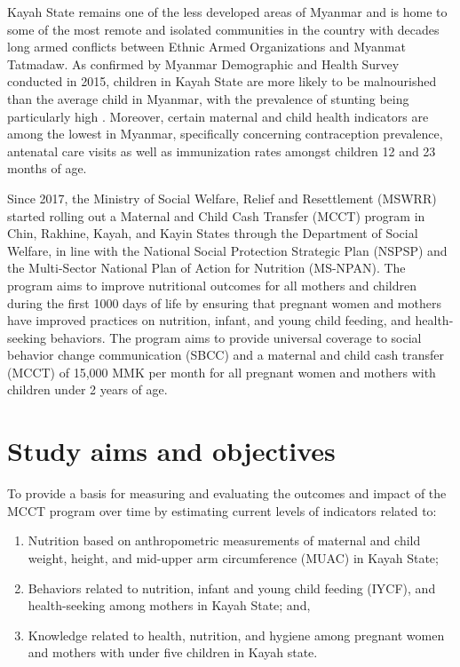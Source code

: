 \documentclass[12pt,a4paper]{article}
\begin{document}
Kayah State remains one of the less developed areas of Myanmar and is home to some of the most remote and isolated communities in the country with decades long armed conflicts between Ethnic Armed Organizations and Myanmat Tatmadaw. As confirmed by Myanmar Demographic and Health Survey conducted in 2015, children in Kayah State are more likely to be malnourished than the average child in Myanmar, with the prevalence of stunting being particularly high \citep{MinistryofHealthandSports-MoHS/Myanmar2017}. Moreover, certain maternal and child health indicators are among the lowest in Myanmar, specifically concerning contraception prevalence, antenatal care visits as well as immunization rates amongst children 12 and 23 months of age.

Since 2017, the Ministry of Social Welfare, Relief and Resettlement (MSWRR) started rolling out a Maternal and Child Cash Transfer (MCCT) program in Chin, Rakhine, Kayah, and Kayin States through the Department of Social Welfare, in line with the National Social Protection Strategic Plan (NSPSP) and the Multi-Sector National Plan of Action for Nutrition (MS-NPAN). The program aims to improve nutritional outcomes for all mothers and children during the first 1000 days of life by ensuring that pregnant women and mothers have improved practices on nutrition, infant, and young child feeding, and health-seeking behaviors. The program aims to provide universal coverage to social behavior change communication (SBCC) and a maternal and child cash transfer (MCCT) of 15,000 MMK per month for all pregnant women and mothers with children under 2 years of age.

\hypertarget{objectives}{%
\section{Study aims and objectives}\label{objectives}}

To provide a basis for measuring and evaluating the outcomes and impact of the MCCT program over time by estimating current levels of indicators related to:

\begin{enumerate}
\def\labelenumi{\arabic{enumi}.}
\item
  Nutrition based on anthropometric measurements of maternal and child weight, height, and mid-upper arm circumference (MUAC) in Kayah State;
\item
  Behaviors related to nutrition, infant and young child feeding (IYCF), and health-seeking among mothers in Kayah State; and,
\item
  Knowledge related to health, nutrition, and hygiene among pregnant women and mothers with under five children in Kayah state.
\end{enumerate}
\end{document}
